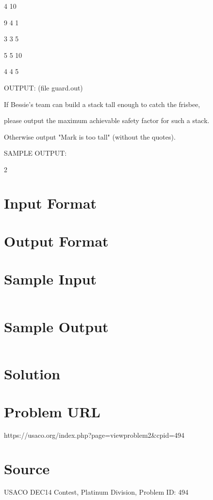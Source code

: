 \documentclass[12pt]{article}
\begin{document}
4 10

9 4 1

3 3 5

5 5 10

4 4 5



OUTPUT: (file guard.out)



If Bessie's team can build a stack tall enough to catch the frisbee,

please output the maximum achievable safety factor for such a stack.

Otherwise output "Mark is too tall" (without the quotes).



SAMPLE OUTPUT:



2




\section*{Input Format}


\section*{Output Format}


\section*{Sample Input}
\begin{verbatim}

\end{verbatim}

\section*{Sample Output}
\begin{verbatim}

\end{verbatim}

\section*{Solution}


\section*{Problem URL}
https://usaco.org/index.php?page=viewproblem2&cpid=494

\section*{Source}
USACO DEC14 Contest, Platinum Division, Problem ID: 494
\end{document}
